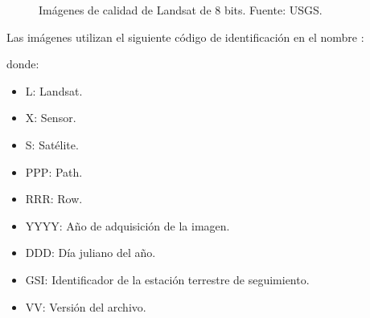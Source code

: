 \begin{figure}
	\centering
	\caption[Imágenes de calidad de Landsat]{Imágenes de calidad de Landsat de 8 bits. Fuente: USGS.}
	\label{fig:imagenescalidad}
\end{figure}

Las imágenes utilizan el siguiente código de identificación en el nombre \citep{Ariza2013} \citep{USGS2015}:

\begin{center}
\end{center}

donde:

\begin{itemize}
	\item L: Landsat.
	\item X: Sensor.
	\item S: Satélite.
	\item PPP: Path.
	\item RRR: Row.
	\item YYYY: Año de adquisición de la imagen.
	\item DDD: Día juliano del año.
	\item GSI: Identificador de la estación terrestre de seguimiento.
	\item VV: Versión del archivo.
\end{itemize}

